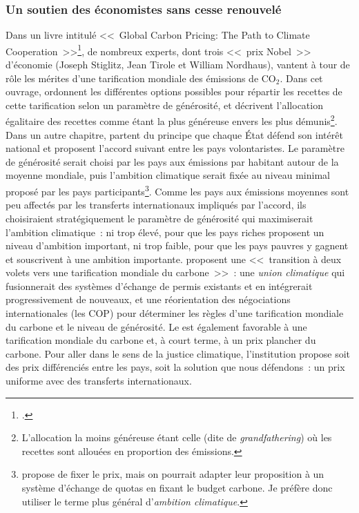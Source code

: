 \documentclass[a5paper,french,openany]{memoir}
\begin{document}
\subsubsection{Un soutien des économistes sans cesse renouvelé}
Dans un livre intitulé <<~Global Carbon Pricing: The Path to Climate Cooperation~>>\footnote{\citet{cramton_global_2017}.}, de nombreux experts, dont trois <<~prix Nobel~>> d'économie (Joseph Stiglitz, Jean Tirole et William Nordhaus), vantent à tour de rôle les mérites d'une tarification mondiale des émissions de CO$_\text{2}$. Dans cet ouvrage, \citet{gollier_negotiating_2015} ordonnent les différentes options possibles pour répartir les recettes de cette tarification selon un paramètre de générosité, et décrivent l'allocation égalitaire des recettes comme étant la plus généreuse envers les plus démunis\footnote{L'allocation la moins généreuse étant celle (dite de \textit{grandfathering}) où les recettes sont allouées en proportion des émissions.}. 
Dans un autre chapitre, \citet{cramton_international_2015} partent du principe que chaque État défend son intérêt national et proposent l'accord suivant entre les pays  volontaristes. %
Le paramètre de générosité serait choisi par les pays aux émissions par habitant autour de la moyenne mondiale, puis l'ambition climatique serait fixée au niveau minimal proposé par les pays participants\footnote{\citet{cramton_international_2015} propose de fixer le prix, mais on pourrait adapter leur proposition à un système d'échange de quotas en fixant le budget carbone. Je préfère donc utiliser le terme plus général d'\textit{ambition climatique}.}. Comme les pays aux émissions moyennes sont peu affectés par les transferts internationaux impliqués par l'accord, ils choisiraient stratégiquement le paramètre de générosité qui maximiserait l'ambition climatique~: ni trop élevé, pour que les pays riches proposent un niveau d'ambition important, ni trop faible, pour que les pays pauvres y gagnent et souscrivent à une ambition importante. \citet{van_den_bergh_dual-track_2020} proposent une <<~transition à deux volets vers une tarification mondiale du carbone~>>~: une \textit{union climatique} qui fusionnerait des systèmes d'échange de permis existants et en intégrerait progressivement de nouveaux, et une réorientation des négociations internationales (les COP) pour déterminer les règles d'une tarification mondiale du carbone et le niveau de générosité. Le \citet{fmi_how_2019} est également favorable à une tarification mondiale du carbone et, à court terme, à un prix plancher du carbone. Pour aller dans le sens de la justice climatique, l'institution propose soit des prix différenciés entre les pays, soit la solution que nous défendons~: un prix uniforme avec des transferts internationaux. 
\end{document}
